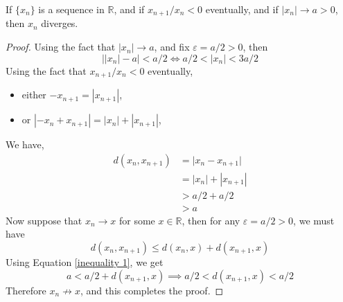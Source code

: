 \documentclass[../../main.tex]{subfiles}
\begin{document}
\providecommand{\xn}{\{x_n\}}

\begin{lemma}\label{lemma:alternating sequence, that does not vanish eventually diverges}
    If $\xn$ is a sequence in $\mathbb{R}$, and if $x_{n+1}/x_n<0$ eventually, and if $|x_n|\to a>0$, then $x_n$ diverges.
\end{lemma}
\begin{proof}
    Using the fact that $|x_n|\to a$, and fix $\varepsilon=a/2>0$, then 
    \[
        \biggl||x_n|-a\biggr|<a/2 \iff a/2<|x_n|<3a/2
    \]
    Using the fact that $x_{n+1}/x_n<0$ eventually, 
    \begin{itemize}
        \item either $-x_{n+1}=|x_{n+1}|$,
        \item or $|-x_n+x_{n+1}|=|x_n|+|x_{n+1}|$,
    \end{itemize}
    We have,
    \begin{align}
        d(x_n,x_{n+1})&=\biggl|x_n-x_{n+1}\biggr|\nonumber\\
        &=|x_n|+|x_{n+1}|\nonumber\\
        &>a/2+a/2\nonumber\\
        &>a\label{inequality 1}
    \end{align}
    Now suppose that $x_n\to x$ for some $x\in\mathbb{R}$, then for any $\varepsilon=a/2>0$, we must have
    \[
        d(x_n,x_{n+1})\leq d(x_n,x) + d(x_{n+1},x)
    \]
    Using Equation \eqref{inequality 1}, we get
    \[
        a<a/2+d(x_{n+1},x)\implies a/2<d(x_{n+1},x)<a/2
    \]
    Therefore $x_n\not\to x$, and this completes the proof.
\end{proof}
\end{document}
